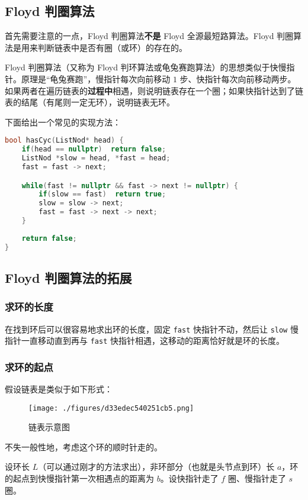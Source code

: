 
\subsection{Floyd 判圈算法}
首先需要注意的一点，Floyd 判圈算法\textbf{不是} Floyd 全源最短路算法。Floyd 判圈算法是用来判断链表中是否有圈（或环）的存在的。

Floyd 判圈算法（又称为 Floyd 判环算法或龟兔赛跑算法）的思想类似于快慢指针。原理是“龟兔赛跑”，慢指针每次向前移动 $1$ 步、快指针每次向前移动两步。如果两者在遍历链表的\textbf{过程中}相遇，则说明链表存在一个圈；如果快指针达到了链表的结尾（有尾则一定无环），说明链表无环。

下面给出一个常见的实现方法：
\begin{lstlisting}[language=cpp]
bool hasCyc(ListNod* head) {
    if(head == nullptr)  return false;
    ListNod *slow = head, *fast = head;
    fast = fast -> next;

    while(fast != nullptr && fast -> next != nullptr) {
        if(slow == fast)  return true;
        slow = slow -> next;
        fast = fast -> next -> next;
    }
    
    return false;
}
\end{lstlisting}

\subsection{Floyd 判圈算法的拓展}
\subsubsection{求环的长度}
在找到环后可以很容易地求出环的长度，固定 \verb`fast` 快指针不动，然后让 \verb`slow` 慢指针一直移动直到再与 \verb`fast` 快指针相遇，这移动的距离恰好就是环的长度。
\subsubsection{求环的起点}
假设链表是类似于如下形式：
\begin{figure}[ht]
\centering
\texttt{[image: ./figures/d33edec540251cb5.png]}
\caption{链表示意图} \label{fig_FloydC_2}
\end{figure}
不失一般性地，考虑这个环的顺时针走的。

设环长 $L$（可以通过刚才的方法求出），非环部分（也就是头节点到环）长 $a$，环的起点到快慢指针第一次相遇点的距离为 $b$。设快指针走了 $f$ 圈、慢指针走了 $s$ 圈。